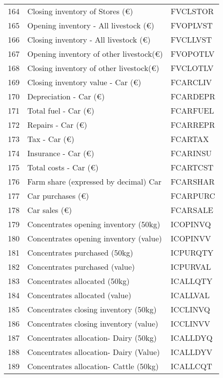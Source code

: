 \documentclass{article}\usepackage{graphicx, color}
\begin{document}
\begin{flushleft}
\begin{table}[ht]
\begin{center}
\begin{tabular}{rll}
  164 & Closing inventory of Stores        (€) & FVCLSTOR \\ 
  165 & Opening inventory - All livestock  (€) & FVOPLVST \\ 
  166 & Closing inventory - All livestock  (€) & FVCLLVST \\ 
  167 & Opening inventory of other livestock(€) & FVOPOTLV \\ 
  168 & Closing inventory of other livestock(€) & FVCLOTLV \\ 
  169 & Closing inventory value - Car   (€) & FCARCLIV \\ 
  170 & Depreciation - Car              (€) & FCARDEPR \\ 
  171 & Total fuel - Car                (€) & FCARFUEL \\ 
  172 & Repairs - Car                   (€) & FCARREPR \\ 
  173 & Tax - Car                       (€) & FCARTAX \\ 
  174 & Insurance - Car                 (€) & FCARINSU \\ 
  175 & Total costs - Car               (€) & FCARTCST \\ 
  176 & Farm share (expressed by decimal) Car & FCARSHAR \\ 
  177 & Car purchases                   (€) & FCARPURC \\ 
  178 & Car sales                       (€) & FCARSALE \\ 
  179 & Concentrates opening inventory (50kg) & ICOPINVQ \\ 
  180 & Concentrates opening inventory (value) & ICOPINVV \\ 
  181 & Concentrates purchased         (50kg) & ICPURQTY \\ 
  182 & Concentrates purchased         (value) & ICPURVAL \\ 
  183 & Concentrates allocated         (50kg) & ICALLQTY \\ 
  184 & Concentrates allocated         (value) & ICALLVAL \\ 
  185 & Concentrates closing inventory (50kg) & ICCLINVQ \\ 
  186 & Concentrates closing inventory (value) & ICCLINVV \\ 
  187 & Concentrates allocation- Dairy (50kg) & ICALLDYQ \\ 
  188 & Concentrates allocation- Dairy (Value) & ICALLDYV \\ 
  189 & Concentrates allocation- Cattle (50kg) & ICALLCQT \\ 

\end{tabular}
\end{center}
\end{table}
\end{flushleft}
\end{document}
